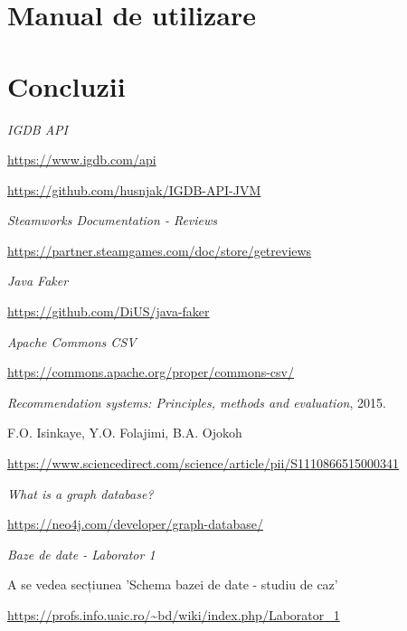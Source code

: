\documentclass[12pt,a4paper]{report}
\begin{document}
\section{Manual de utilizare}
\section{Concluzii}

\renewcommand\bibname{Bibliografie}
\begin{thebibliography}{9}

  
  \textit{IGDB API}
  
  \url{https://www.igdb.com/api}
  
  \url{https://github.com/husnjak/IGDB-API-JVM}
  
  
  \textit{Steamworks Documentation - Reviews}
  
  \url{https://partner.steamgames.com/doc/store/getreviews}
  
  
  \textit{Java Faker}
  
  \url{https://github.com/DiUS/java-faker}
  
  
  \textit{Apache Commons CSV}
  
  \url{https://commons.apache.org/proper/commons-csv/}


  
  \textit{Recommendation systems: Principles, methods and evaluation},
  2015.
  
  F.O. Isinkaye, Y.O. Folajimi, B.A. Ojokoh
  
  \url{https://www.sciencedirect.com/science/article/pii/S1110866515000341}
  
  
  \textit{What is a graph database?}
  
  \url{https://neo4j.com/developer/graph-database/}
  
  
  \textit{Baze de date - Laborator 1}
  
  A se vedea secțiunea 'Schema bazei de date - studiu de caz'
  
  
  \url{https://profs.info.uaic.ro/~bd/wiki/index.php/Laborator_1}
  
  

\end{thebibliography}
\end{document}
